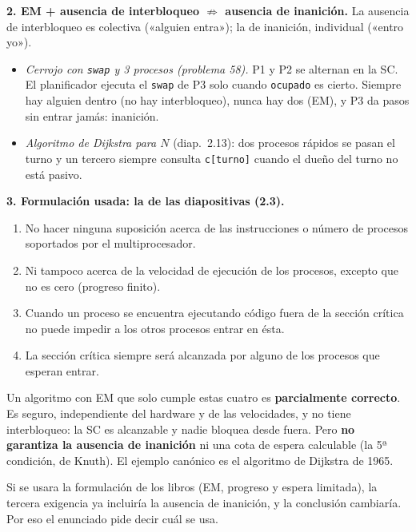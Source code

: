 \documentclass[11pt,a4paper,oneside]{report}
\begin{document}
\begin{solucion}
\textbf{2. EM + ausencia de interbloqueo $\not\Rightarrow$ ausencia de inanición.} La ausencia de interbloqueo
es colectiva («alguien entra»); la de inanición, individual («entro yo»).
\begin{itemize}[leftmargin=*]
  \item \emph{Cerrojo con \texttt{swap} y 3 procesos (problema 58).} P1 y P2 se alternan en la SC. El
        planificador ejecuta el \texttt{swap} de P3 solo cuando \texttt{ocupado} es cierto. Siempre hay alguien
        dentro (no hay interbloqueo), nunca hay dos (EM), y P3 da pasos sin entrar jamás: inanición.
  \item \emph{Algoritmo de Dijkstra para $N$} (diap.\ 2.13): dos procesos rápidos se pasan el turno y un tercero
        siempre consulta \texttt{c[turno]} cuando el dueño del turno no está pasivo.
\end{itemize}

\textbf{3. Formulación usada: la de las diapositivas (2.3).}
\begin{enumerate}[leftmargin=*,noitemsep]
  \item No hacer ninguna suposición acerca de las instrucciones o número de procesos soportados por el
        multiprocesador.
  \item Ni tampoco acerca de la velocidad de ejecución de los procesos, excepto que no es cero (progreso finito).
  \item Cuando un proceso se encuentra ejecutando código fuera de la sección crítica no puede impedir a los otros
        procesos entrar en ésta.
  \item La sección crítica siempre será alcanzada por alguno de los procesos que esperan entrar.
\end{enumerate}
Un algoritmo con EM que solo cumple estas cuatro es \textbf{parcialmente correcto}. Es seguro, independiente del
hardware y de las velocidades, y no tiene interbloqueo: la SC es alcanzable y nadie bloquea desde fuera. Pero
\textbf{no garantiza la ausencia de inanición} ni una cota de espera calculable (la 5ª condición, de Knuth). El
ejemplo canónico es el algoritmo de Dijkstra de 1965.

Si se usara la formulación de los libros (EM, progreso y espera limitada), la tercera exigencia ya incluiría la
ausencia de inanición, y la conclusión cambiaría. Por eso el enunciado pide decir cuál se usa.
\end{solucion}
\end{document}
